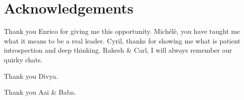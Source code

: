 \chapter*{Acknowledgements}\label{chapter:preface}


Thank you Enrico for giving me this opportunity. Mich\'el\`e, you have taught me what it 
means to be a real leader. Cyril, thanks for showing me what is patient introspection and 
deep thinking. Rakesh \& Carl, I will always remember our quirky chats.

Thank you Divya.

Thank you Aai \& Baba.